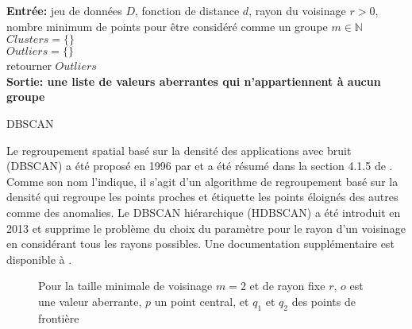 \begin{algorithm}[h]
\SetAlgoLined
\textbf{Entrée:} jeu de données $D$,
fonction de distance $d$,
rayon du voisinage $r>0$,
nombre minimum de points pour être considéré comme un groupe $m\in\mathbb{N}$
\\$Clusters = \{\}$
\\$Outliers = \{\}$
\\
retourner $Outliers$
\\\textbf{Sortie: une liste de valeurs aberrantes qui n'appartiennent à aucun groupe}
\caption{DBSCAN}
\end{algorithm}

Le regroupement spatial basé sur la densité des applications avec bruit (DBSCAN) a été proposé en 1996 par \cite{DBSCAN} et a été résumé dans la section 4.1.5 de \cite{A10}.
Comme son nom l'indique, il s'agit d'un algorithme de regroupement basé sur la densité qui regroupe les points proches et étiquette les points éloignés des autres comme des anomalies.
Le DBSCAN hiérarchique (HDBSCAN) \cite{HDBSCAN} a été introduit en 2013 et supprime le problème du choix du paramètre pour le rayon d'un voisinage en considérant tous les rayons possibles.
Une documentation supplémentaire est disponible à \cite{HDBSCAN_code}.

\begin{figure}[H]
\centering
{}
\caption{Pour la taille minimale de voisinage $m=2$ et de rayon fixe $r$, $o$ est une valeur aberrante, $p$ un point central, et $q_1$ et $q_2$ des points de frontière}
\label{DBSCANlabels}
\end{figure}

